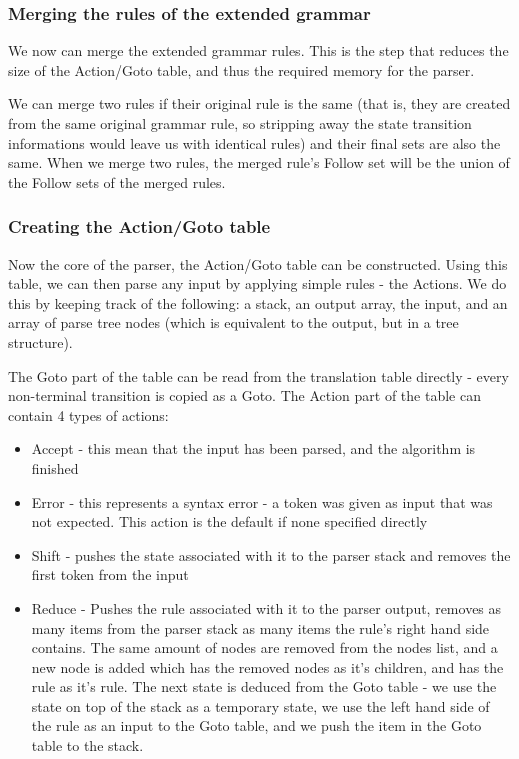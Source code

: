 \subsubsection{Merging the rules of the extended grammar} 
We now can merge the extended grammar rules. This is the step that reduces the size of the Action/Goto table, and thus the required memory for the parser.

We can merge two rules if their original rule is the same (that is, they are created from the same original grammar rule, so stripping away the state transition informations would leave us with identical rules) and their final sets are also the same. When we merge two rules, the merged rule's Follow set will be the union of the Follow sets of the merged rules. 
\subsubsection{Creating the Action/Goto table} 
Now the core of the parser, the Action/Goto table can be constructed. Using this table, we can then parse any input by applying simple rules - the Actions. We do this by keeping track of the following: a stack, an output array, the input, and an array of parse tree nodes (which is equivalent to the output, but in a tree structure).

The Goto part of the table can be read from the translation table directly - every non-terminal transition is copied as a Goto. The Action part of the table can contain 4 types of actions:
\begin{itemize}
\item Accept - this mean that the input has been parsed, and the algorithm is finished
\item Error - this represents a syntax error - a token was given as input that was not expected. This action is the default if none specified directly
\item Shift - pushes the state associated with it to the parser stack and removes the first token from the input
\item Reduce - Pushes the rule associated with it to the parser output, removes as many items from the parser stack as many items the rule's right hand side contains. The same amount of nodes are removed from the nodes list, and a new node is added which has the removed nodes as it's children, and has the rule as it's rule. The next state is deduced from the Goto table - we use the state on top of the stack as a temporary state, we use the left hand side of the rule as an input to the Goto table, and we push the item in the Goto table to the stack.
\end{itemize}

